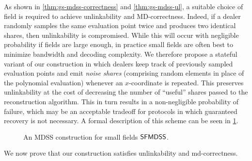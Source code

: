 As shown in  \cref{thm:gs-mdss-correctness} and \cref{thm:gs-mdss-ul}, a suitable choice of field is required to achieve unlinkability and MD-correctness.
Indeed, if a dealer randomly samples the same evaluation point twice and produces two identical shares, then unlinkability is compromised.
While this will occur with negligible probability if fields are large enough, in practice small fields are often best to minimize bandwidth and decoding complexity.
We therefore propose a stateful variant of our construction in which dealers keep track of previously sampled evaluation points and emit {\em noise shares} (comprising random elements in place of the polynomial evaluation) whenever an $x$-coordinate is repeated.
This preserves unlinkability at the cost of decreasing the number of ``useful'' shares passed to the reconstruction algorithm.
This in turn results in a non-negligible probability of failure, which may be an acceptable tradeoff for protocols in which guaranteed recovery is not necessary.
A formal description of this scheme can be seen in \cref{fig:gs-mdss-small-field}.

\begin{figure}
	\begin{pcvstack}[boxed, center, space=1em]

	\end{pcvstack}
	\caption{An MDSS construction for small fields $\mathsf{SFMDSS}$.}
	\label{fig:gs-mdss-small-field}
\end{figure}
We now prove that our construction satisfies unlinkability and md-correctness.

